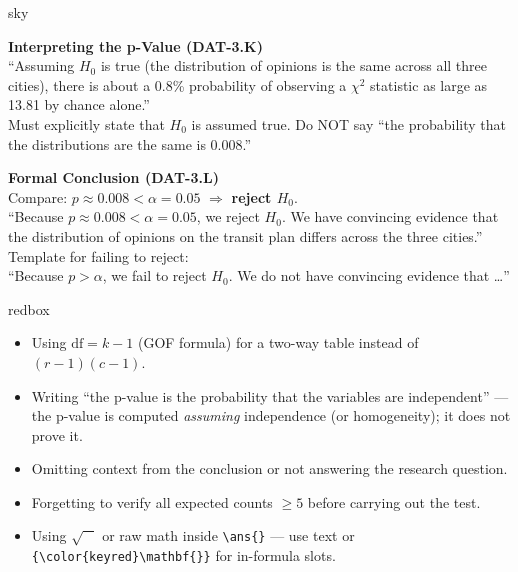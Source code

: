 \documentclass[10pt]{article}
\begin{document}
\begin{skillbox}{sky}
\begin{minipage}[t]{0.48\linewidth}
    \textbf{Interpreting the p-Value (DAT-3.K)}\\
    ``Assuming $H_0$ is true (the distribution of opinions is the same across all
    three cities), there is about a 0.8\% probability of observing a $\chi^2$ statistic
    as large as 13.81 by chance alone.''\\[6pt]
    Must explicitly state that $H_0$ is assumed true.  Do NOT say ``the probability
    that the distributions are the same is 0.008.''
\end{minipage}
\hfill
\begin{minipage}[t]{0.48\linewidth}
    \textbf{Formal Conclusion (DAT-3.L)}\\
    Compare: $p \approx 0.008 < \alpha = 0.05$ $\Rightarrow$ \textbf{reject $H_0$}.\\[4pt]
    ``Because $p \approx 0.008 < \alpha = 0.05$, we reject $H_0$.  We have convincing
    evidence that the distribution of opinions on the transit plan differs across the
    three cities.''\\[4pt]
    Template for failing to reject:\\
    ``Because $p > \alpha$, we fail to reject $H_0$.  We do not have convincing
    evidence that \ldots''
\end{minipage}
\end{skillbox}

\begin{skillbox}{redbox}
\begin{itemize}
    \item Using $\text{df} = k - 1$ (GOF formula) for a two-way table instead of $(r-1)(c-1)$.
    \item Writing ``the p-value is the probability that the variables are independent'' --- the p-value is computed \emph{assuming} independence (or homogeneity); it does not prove it.
    \item Omitting context from the conclusion or not answering the research question.
    \item Forgetting to verify all expected counts $\ge 5$ before carrying out the test.
    \item Using $\sqrt{\phantom{X}}$ or raw math inside \verb|\ans{}| --- use text or \verb|{\color{keyred}\mathbf{}}| for in-formula slots.
\end{itemize}
\end{skillbox}
\end{document}
